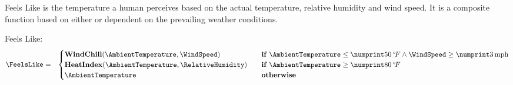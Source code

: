 
Feels Like is the temperature a human perceives based on the actual temperature, relative humidity and wind speed.
It is a composite function based on either  or  dependent on the prevailing
weather conditions.

\begin{definition}Feels Like:
\begin{eqnarray*}
    \FeelsLike &=&
    \begin{cases}
        \GoFunctionCall{WindChill}{\AmbientTemperature, \WindSpeed} & \quad \textbf{if } \AmbientTemperature\leq\Fahrenheit{50} \land \WindSpeed\geq\MilesPerHour{3}\\
        \GoFunction{HeatIndex}( \AmbientTemperature, \RelativeHumidity) & \quad \textbf{if } \AmbientTemperature\geq\Fahrenheit{80} \\
        \AmbientTemperature & \quad \textbf{otherwise}
    \end{cases}
\end{eqnarray*}

\end{definition}
